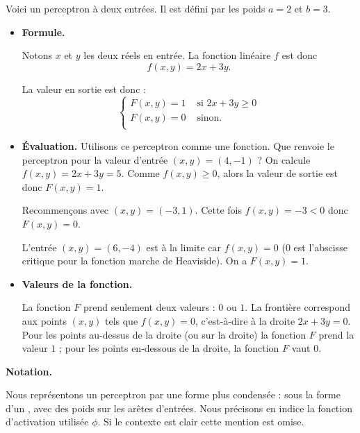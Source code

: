 \documentclass[11pt,class=report,crop=false]{standalone}
\begin{document}
\begin{exemple}

Voici un perceptron à deux entrées. Il est défini par les poids $a=2$ et $b=3$.



\begin{itemize}
  \item \textbf{Formule.}
  
Notons $x$ et $y$ les deux réels en entrée.
La fonction linéaire $f$ est donc 
$$f(x,y) = 2x+3y.$$

La valeur en sortie est donc :
$$\begin{cases}
F(x,y) = 1 & \text{ si } 2x+3y \ge 0 \\
F(x,y) = 0  & \text{ sinon.} \\
\end{cases}$$


  \item \textbf{\'Evaluation.} 
  Utilisons ce perceptron comme une fonction. Que renvoie le perceptron pour la valeur d'entrée $(x,y) = (4,-1)$ ?
On calcule $f(x,y) = 2x+3y = 5$. Comme $f(x,y)\ge0$, alors la valeur de sortie est donc $F(x,y) = 1$.

	Recommençons avec $(x,y) = (-3,1)$. Cette fois $f(x,y) = -3 < 0$ donc $F(x,y) = 0$.
	
	L'entrée $(x,y) = (6,-4)$ est \og{}à la limite\fg{} car $f(x,y)=0$ ($0$ est l'abscisse critique pour la fonction marche de Heaviside).
	On a $F(x,y) = 1$.

  \item \textbf{Valeurs de la fonction.}
  
  La fonction $F$ prend seulement deux valeurs : $0$ ou $1$. La frontière correspond aux points $(x,y)$ tels que
  $f(x,y)=0$, c'est-à-dire à la droite $2x+3y=0$.  
  Pour les points au-dessus de la droite (ou sur la droite) la fonction $F$ prend la valeur $1$ ;
  pour les points en-dessous de la droite, la fonction $F$ vaut $0$.
  
  
\end{itemize}
\end{exemple}

\textbf{Notation.}

Nous représentons un perceptron par une forme plus condensée : 
sous la forme d'un , avec des poids sur les arêtes d'entrées. 
Nous précisons en indice la fonction d'activation utilisée  $\phi$.
Si le contexte est clair cette mention est omise.
\end{document}
